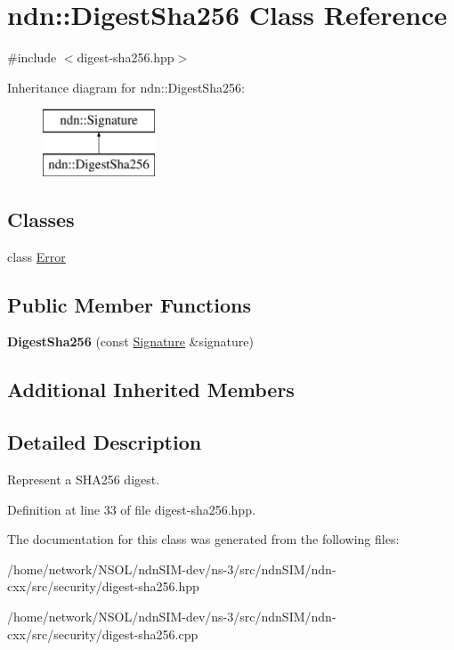 \hypertarget{classndn_1_1DigestSha256}{}\section{ndn\+:\+:Digest\+Sha256 Class Reference}
\label{classndn_1_1DigestSha256}


{\ttfamily \#include $<$digest-\/sha256.\+hpp$>$}

Inheritance diagram for ndn\+:\+:Digest\+Sha256\+:\begin{figure}[H]
\begin{center}
\leavevmode
\includegraphics[height=2.000000cm]{classndn_1_1DigestSha256}
\end{center}
\end{figure}
\subsection*{Classes}
\begin{DoxyCompactItemize}
\item 
class \hyperlink{classndn_1_1DigestSha256_1_1Error}{Error}
\end{DoxyCompactItemize}
\subsection*{Public Member Functions}
\begin{DoxyCompactItemize}
\item 
{\bfseries Digest\+Sha256} (const \hyperlink{classndn_1_1Signature}{Signature} \&signature)\hypertarget{classndn_1_1DigestSha256_ae7e64a4ae29a5bb5d8b8cdde9d6abbf9}{}\label{classndn_1_1DigestSha256_ae7e64a4ae29a5bb5d8b8cdde9d6abbf9}

\end{DoxyCompactItemize}
\subsection*{Additional Inherited Members}


\subsection{Detailed Description}
Represent a S\+H\+A256 digest. 

Definition at line 33 of file digest-\/sha256.\+hpp.



The documentation for this class was generated from the following files\+:\begin{DoxyCompactItemize}
\item 
/home/network/\+N\+S\+O\+L/ndn\+S\+I\+M-\/dev/ns-\/3/src/ndn\+S\+I\+M/ndn-\/cxx/src/security/digest-\/sha256.\+hpp\item 
/home/network/\+N\+S\+O\+L/ndn\+S\+I\+M-\/dev/ns-\/3/src/ndn\+S\+I\+M/ndn-\/cxx/src/security/digest-\/sha256.\+cpp\end{DoxyCompactItemize}
